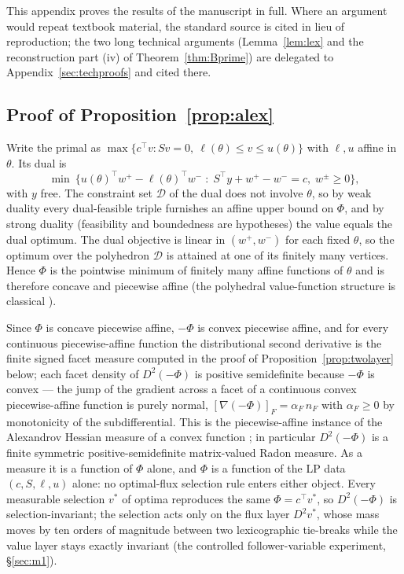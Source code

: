 \documentclass[11pt,a4paper]{article}
\theoremstyle{plain}
\theoremstyle{definition}
\theoremstyle{remark}
\begin{document}
This appendix proves the results of the manuscript in full. Where an
argument would repeat textbook material, the standard source is cited
in lieu of reproduction; the two long technical arguments
(Lemma~\ref{lem:lex} and the reconstruction part (iv) of
Theorem~\ref{thm:Bprime}) are delegated to
Appendix~\ref{sec:techproofs} and cited there.

\subsection{Proof of Proposition~\ref{prop:alex}}

Write the primal as $\max\{c^\top v : Sv = 0,\ \ell(\theta) \le v
\le u(\theta)\}$ with $\ell, u$ affine in $\theta$. Its dual is
\[
\min\ \bigl\{u(\theta)^\top w^{+} - \ell(\theta)^\top w^{-}
\;:\; S^\top y + w^{+} - w^{-} = c,\; w^{\pm} \ge 0\bigr\},
\]
with $y$ free. The constraint set $\mathcal{D}$ of the dual does not
involve $\theta$, so by weak duality every dual-feasible triple
furnishes an affine upper bound on $\Phi$, and by strong duality
(feasibility and boundedness are hypotheses) the value equals the
dual optimum. The dual objective is linear in $(w^{+}, w^{-})$ for
each fixed $\theta$, so the optimum over the polyhedron
$\mathcal{D}$ is attained at one of its finitely many vertices.
Hence $\Phi$ is the pointwise minimum of finitely many affine
functions of $\theta$ and is therefore concave and piecewise affine
(the polyhedral value-function structure is classical
\citep{rockafellar1970, borrelli2003}).

Since $\Phi$ is concave piecewise affine, $-\Phi$ is convex piecewise
affine, and for every continuous piecewise-affine function the
distributional second derivative is the finite signed facet measure
computed in the proof of Proposition~\ref{prop:twolayer} below; each
facet density of $D^{2}(-\Phi)$ is positive semidefinite because
$-\Phi$ is convex --- the jump of the gradient across a facet of a
continuous convex piecewise-affine function is purely normal,
$[\nabla(-\Phi)]_{F} = \alpha_F\, n_F$ with $\alpha_F \ge 0$ by
monotonicity of the subdifferential. This is the piecewise-affine
instance of the Alexandrov Hessian measure of a convex function
\citep{alexandrov1939}; in particular $D^{2}(-\Phi)$ is a finite
symmetric positive-semidefinite matrix-valued Radon measure. As a
measure it is a function of $\Phi$ alone, and $\Phi$ is a function
of the LP data $(c, S, \ell, u)$ alone: no optimal-flux selection
rule enters either object. Every measurable selection $v^{*}$ of
optima reproduces the same $\Phi = c^{\top}v^{*}$, so
$D^{2}(-\Phi)$ is selection-invariant; the selection acts only on
the flux layer $D^{2}v^{*}$, whose mass moves by ten orders of
magnitude between two lexicographic tie-breaks while the value
layer stays exactly invariant (the controlled follower-variable
experiment, \S\ref{sec:m1}).
\end{document}
